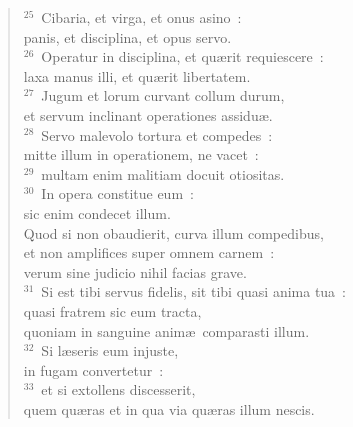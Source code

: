 \begin{flushleft}\begin{verse}${}^{25}$~Cibaria, et virga, et onus asino~:\\ panis, et disciplina, et opus servo.\\
${}^{26}$~Operatur in disciplina, et qu\ae rit requiescere~:\\ laxa manus illi, et qu\ae rit libertatem.\\
${}^{27}$~Jugum et lorum curvant collum durum,\\ et servum inclinant operationes assidu\ae .\\
${}^{28}$~Servo malevolo tortura et compedes~:\\ mitte illum in operationem, ne vacet~:\\
${}^{29}$~multam enim malitiam docuit otiositas.\\
${}^{30}$~In opera constitue eum~:\\ sic enim condecet illum.\\ Quod si non obaudierit, curva illum compedibus,\\ et non amplifices super omnem carnem~:\\ verum sine judicio nihil facias grave.\\
${}^{31}$~Si est tibi servus fidelis, sit tibi quasi anima tua~:\\ quasi fratrem sic eum tracta,\\ quoniam in sanguine anim\ae\ comparasti illum.\\
${}^{32}$~Si l\ae seris eum injuste,\\ in fugam convertetur~:\\
${}^{33}$~et si extollens discesserit,\\ quem qu\ae ras et in qua via qu\ae ras illum nescis.\end{verse}\end{flushleft}


